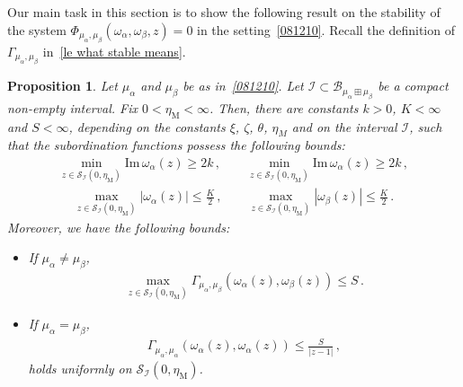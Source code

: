 \documentclass[10pt,reqno]{amsart}
\numberwithin{equation}{section}
\theoremstyle{plain}
\newtheorem{proposition}[theorem]{Proposition}
\numberwithin{kevin}{section}
\theoremstyle{remark}
\newcommand{\im}{\mathrm{Im}\,}
\newcommand{\PP}{\Phi}
\begin{document}
Our main task in this section is to show the following  result on the stability of the system $\PP_{\mu_\alpha,\mu_\beta}(\omega_\alpha,\omega_\beta,z)=0$ in the setting~\eqref{081210}. Recall the definition of $\Gamma_{\mu_\alpha,\mu_\beta}$ in~\eqref{le what stable means}.
\begin{proposition} \label{stability for two point mass}
Let $\mu_\alpha$ and $\mu_\beta$ be as in~\eqref{081210}. Let $\mathcal{I}\subset\mathcal{B}_{\mu_\alpha\boxplus\mu_\beta}$ be a compact non-empty interval. Fix $0< \eta_{\mathrm{M}}<\infty$. Then, there are constants $k>0$, $K<\infty$ and $S<\infty$, depending on the constants $\xi$, $\zeta$, $\theta$, $\eta_M$ and on the interval $\mathcal{I}$, such that  the subordination functions possess the following bounds:
\begin{align}\label{two point mass different: minimum of omegas}
 \min_{z\in \mathcal{S}_{\mathcal{I}}(0,\eta_{\mathrm{M}})}\im \omega_\alpha(z)\ge 2k\,,\qquad \min_{z\in \mathcal{S}_{\mathcal{I}}(0,\eta_{\mathrm{M}})}\im \omega_\alpha(z)\ge 2k\,,
\end{align}
\begin{align}\label{two point mass different: maximum of omegas}
 \max_{z\in \mathcal{S}_{\mathcal{I}}(0,\eta_{\mathrm{M}})}|\omega_\alpha(z)|\le \frac{K}{2}\,,\qquad\max_{z\in \mathcal{S}_{\mathcal{I}}(0,\eta_{\mathrm{M}})}|\omega_\beta(z)|\le\frac{K}{2}\,.
\end{align}
Moreover, we have the following bounds:
\begin{itemize}
\item[$(i)$] If $\mu_\alpha\neq \mu_\beta$,
\begin{align} \label{bound of gamma for special case 1}
\max_{z\in \mathcal{S}_{\mathcal{I}}(0,\eta_{\mathrm{M}})}\Gamma_{\mu_\alpha,\mu_\beta}(\omega_\alpha(z),\omega_\beta(z))\le S\,.
\end{align}
\item[$(ii)$] If $\mu_\alpha= \mu_\beta$, 
\begin{align} \label{bound of gamma for special case 2}
\Gamma_{\mu_\alpha,\mu_\alpha}(\omega_\alpha(z),\omega_\alpha(z))\le \frac{S}{|z-1|}\,,
\end{align}
holds uniformly on $\mathcal{S}_{\mathcal{I}}(0,\eta_{\mathrm{M}})$.
\end{itemize}
\end{proposition}
\end{document}
